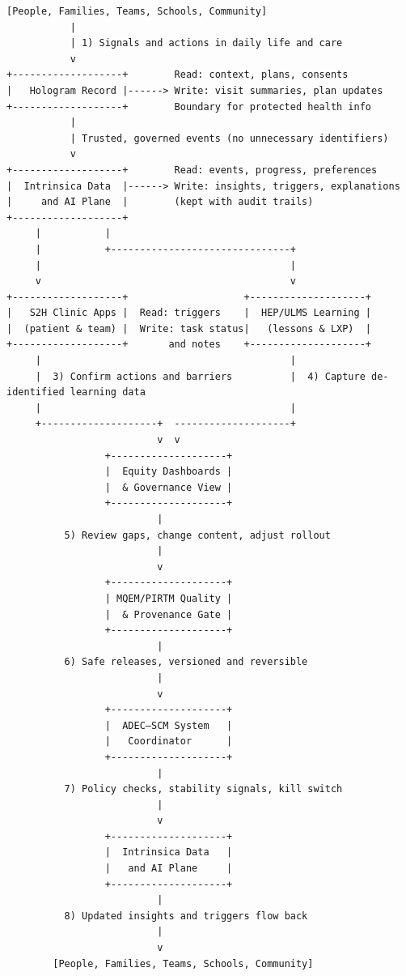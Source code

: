 \documentclass[12pt]{article}
\begin{document}
\begin{verbatim}
[People, Families, Teams, Schools, Community]
           |
           | 1) Signals and actions in daily life and care
           v
+-------------------+        Read: context, plans, consents
|   Hologram Record |------> Write: visit summaries, plan updates
+-------------------+        Boundary for protected health info
           |
           | Trusted, governed events (no unnecessary identifiers)
           v
+-------------------+        Read: events, progress, preferences
|  Intrinsica Data  |------> Write: insights, triggers, explanations
|     and AI Plane  |        (kept with audit trails)
+-------------------+
     |           |
     |           +-------------------------------+
     |                                           |
     v                                           v
+-------------------+                    +--------------------+
|   S2H Clinic Apps |  Read: triggers    |  HEP/ULMS Learning |
|  (patient & team) |  Write: task status|   (lessons & LXP)  |
+-------------------+       and notes    +--------------------+
     |                                           |
     |  3) Confirm actions and barriers          |  4) Capture de-identified learning data
     |                                           |
     +--------------------+  --------------------+
                          v  v
                 +--------------------+
                 |  Equity Dashboards |
                 |  & Governance View |
                 +--------------------+
                          |
          5) Review gaps, change content, adjust rollout
                          |
                          v
                 +--------------------+
                 | MQEM/PIRTM Quality |
                 |  & Provenance Gate |
                 +--------------------+
                          |
          6) Safe releases, versioned and reversible
                          |
                          v
                 +--------------------+
                 |  ADEC–SCM System   |
                 |   Coordinator      |
                 +--------------------+
                          |
          7) Policy checks, stability signals, kill switch
                          |
                          v
                 +--------------------+
                 |  Intrinsica Data   |
                 |   and AI Plane     |
                 +--------------------+
                          |
          8) Updated insights and triggers flow back
                          |
                          v
        [People, Families, Teams, Schools, Community]
\end{verbatim}
\end{document}
